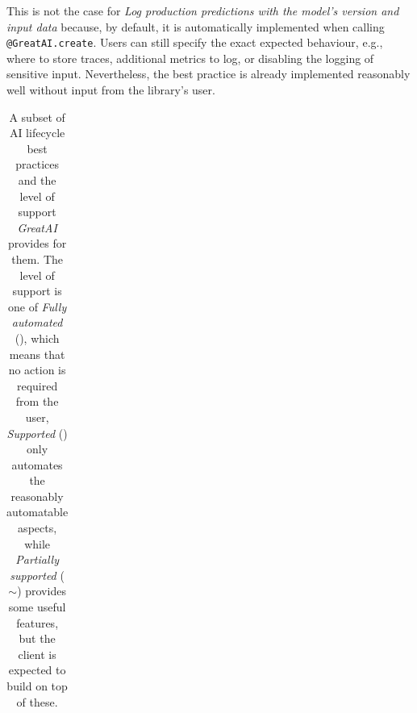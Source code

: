 This is not the case for \textit{Log production predictions with the model's version and input data} because, by default, it is automatically implemented when calling \texttt{@GreatAI.create}. Users can still specify the exact expected behaviour, e.g., where to store traces, additional metrics to log, or disabling the logging of sensitive input. Nevertheless, the best practice is already implemented reasonably well without input from the library's user.

\begin{table}
\centering
\begin{threeparttable}
\caption{A subset of AI lifecycle best practices and the level of support \textit{GreatAI} provides for them. The level of support is one of \textit{Fully automated} (\checkmark\checkmark), which means that no action is required from the user, \textit{Supported} (\checkmark) only automates the reasonably automatable aspects, while \textit{Partially supported} ($\sim$) provides some useful features, but the client is expected to build on top of these.}

\label{table:best-practices-1}
{\renewcommand{\arraystretch}{1.2} %
\begin{tabular}{p{7cm}@{\hskip 0.5cm}l@{\hskip 0cm}c} \hline


\end{tabular}}
\end{threeparttable}
\end{table}
